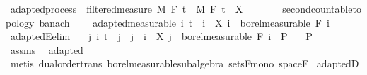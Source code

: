 \begin{isabellebody}
\begin{isamarkuptext}
\end{isamarkuptext}\isamarkuptrue%
\isamarkupfalse%
\ adapted{\isacharunderscore}{\kern0pt}process\ {\isacharequal}{\kern0pt}\ filtered{\isacharunderscore}{\kern0pt}measure\ M\ F\ t\ \ M\ F\ t\ \ X\ {\isacharcolon}{\kern0pt}{\isacharcolon}{\kern0pt}\ {\isachardoublequoteopen}{\isacharunderscore}{\kern0pt}\ {\isasymRightarrow}\ {\isacharunderscore}{\kern0pt}\ {\isasymRightarrow}\ {\isacharunderscore}{\kern0pt}\ {\isacharcolon}{\kern0pt}{\isacharcolon}{\kern0pt}\ {\isacharbraceleft}{\kern0pt}second{\isacharunderscore}{\kern0pt}countable{\isacharunderscore}{\kern0pt}topology{\isacharcomma}{\kern0pt}\ banach{\isacharbraceright}{\kern0pt}{\isachardoublequoteclose}\ {\isacharplus}{\kern0pt}\isanewline
\ \ \ adapted{\isacharbrackleft}{\kern0pt}measurable{\isacharbrackright}{\kern0pt}{\isacharcolon}{\kern0pt}\ {\isachardoublequoteopen}{\isasymAnd}i{\isachardot}{\kern0pt}\ t\ {\isasymle}\ i\ {\isasymLongrightarrow}\ X\ i\ {\isasymin}\ borel{\isacharunderscore}{\kern0pt}measurable\ {\isacharparenleft}{\kern0pt}F\ i{\isacharparenright}{\kern0pt}{\isachardoublequoteclose}\isanewline
{}\isanewline
\isanewline
{}\isamarkupfalse%
\ adaptedE{\isacharbrackleft}{\kern0pt}elim{\isacharbrackright}{\kern0pt}{\isacharcolon}{\kern0pt}\isanewline
\ \ \ {\isachardoublequoteopen}{\isasymlbrakk}{\isasymAnd}j\ i{\isachardot}{\kern0pt}\ t\ {\isasymle}\ j\ {\isasymLongrightarrow}\ j\ {\isasymle}\ i\ {\isasymLongrightarrow}\ X\ j\ {\isasymin}\ borel{\isacharunderscore}{\kern0pt}measurable\ {\isacharparenleft}{\kern0pt}F\ i{\isacharparenright}{\kern0pt}{\isasymrbrakk}\ {\isasymLongrightarrow}\ P{\isachardoublequoteclose}\isanewline
\ \ \ P\isanewline
%
\isadelimproof
\ \ %
\endisadelimproof
%
\isatagproof
{}\isamarkupfalse%
\ assms\ \isamarkupfalse%
\ adapted\ \isamarkupfalse%
\ {\isacharparenleft}{\kern0pt}metis\ dual{\isacharunderscore}{\kern0pt}order{\isachardot}{\kern0pt}trans\ borel{\isacharunderscore}{\kern0pt}measurable{\isacharunderscore}{\kern0pt}subalgebra\ sets{\isacharunderscore}{\kern0pt}F{\isacharunderscore}{\kern0pt}mono\ space{\isacharunderscore}{\kern0pt}F{\isacharparenright}{\kern0pt}%
\endisatagproof
{\isafoldproof}%
%
\isadelimproof
\isanewline
%
\endisadelimproof
\isanewline
{}\isamarkupfalse%
\ adaptedD{\isacharcolon}{\kern0pt}\isanewline

\end{isabellebody}
